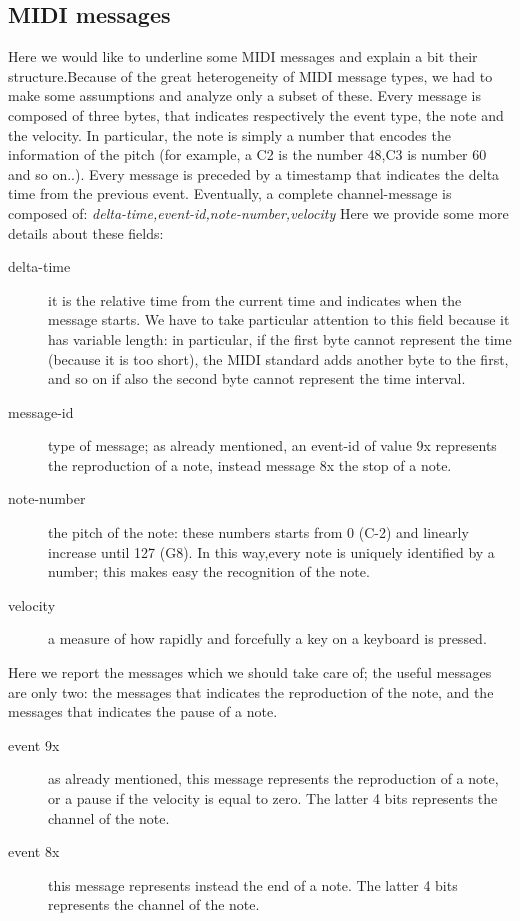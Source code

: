 \documentclass[12pt]{article}
\begin{document}
\subsection{MIDI messages}
Here we would like to underline some MIDI messages and explain a bit their structure.Because of the great heterogeneity of MIDI message types, we had to make some assumptions and analyze only a subset of these. Every message is composed of three bytes, that indicates respectively the event type, the note and the velocity. In particular, the note is simply a number that encodes the information of the pitch (for example, a C2 is the number 48,C3 is number 60 and so on..). 
Every message is preceded by a timestamp that indicates the delta time from the previous event.\newline
Eventually, a complete channel-message is composed of: \newline
\emph{delta-time,event-id,note-number,velocity} \newline
Here we provide some more details about these fields:\newline
\begin{description}
	\item[delta-time] it is the relative time from the current time and indicates when the message starts. We have to take particular attention to this field because it has variable length: in particular, if the first byte cannot represent the time (because it is too short), the MIDI standard adds another byte to the first, and so on if also the second byte cannot represent the time interval.
	\item[message-id] type of message; as already mentioned, an event-id of value 9x represents the reproduction of a note, instead message 8x the stop of a note.
	\item[note-number] the pitch of the note: these numbers starts from 0 (C-2) and linearly increase until 127 (G8). In this way,every note is uniquely identified by a number; this makes easy the recognition of the note.
	\item[velocity] a measure of how rapidly and forcefully a key on a keyboard is pressed.
\end{description}
Here we report the messages which we should take care of; the useful messages are only two: the messages that indicates the reproduction of the note, and the messages that indicates the pause of a note.
\begin{description} 
	\item[event 9x]  as already mentioned, this message represents the reproduction of a note, or a pause if the velocity is equal to zero. The latter 4 bits represents the channel of the note.
	\item[event 8x] this message represents instead the end of a note. The latter 4 bits represents the channel of the note.
\end{description}
\end{document}
